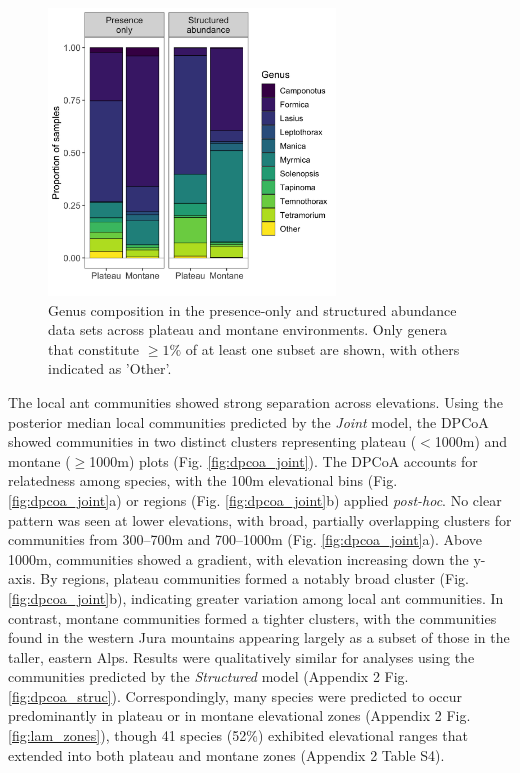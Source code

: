 \documentclass[preprint,review,times,12pt,3p]{elsarticle}
\begin{document}
\begin{figure}
	\centering\includegraphics[width=3in]{../../../ms/1_Ecography/1/figs/genus_assemblages.png}
	\caption{\label{fig:genus_assemblages} Genus composition in the presence-only and structured abundance data sets across plateau and montane environments. Only genera that constitute $\geq 1\%$ of at least one subset are shown, with others indicated as 'Other'.}
\end{figure}

The local ant communities showed strong separation across elevations. Using the posterior median local communities predicted by the \emph{Joint} model, the DPCoA showed communities in two distinct clusters representing plateau ($<$1000m) and montane ($\geq$1000m) plots (Fig. \ref{fig:dpcoa_joint}). The DPCoA accounts for relatedness among species, with the 100m elevational bins (Fig. \ref{fig:dpcoa_joint}a) or regions (Fig. \ref{fig:dpcoa_joint}b) applied \emph{post-hoc}. No clear pattern was seen at lower elevations, with broad, partially overlapping clusters for communities from 300–700m and 700–1000m (Fig. \ref{fig:dpcoa_joint}a). Above 1000m, communities showed a gradient, with elevation increasing down the y-axis. By regions, plateau communities formed a notably broad cluster (Fig. \ref{fig:dpcoa_joint}b), indicating greater variation among local ant communities. In contrast, montane communities formed a tighter clusters, with the communities found in the western Jura mountains appearing largely as a subset of those in the taller, eastern Alps. Results were qualitatively similar for analyses using the communities predicted by the \emph{Structured} model (Appendix 2 Fig. \ref{fig:dpcoa_struc}). Correspondingly, many species were predicted to occur predominantly in plateau or in montane elevational zones (Appendix 2 Fig. \ref{fig:lam_zones}), though 41 species (52\%) exhibited elevational ranges that extended into both plateau and montane zones (Appendix 2 Table S4).
\end{document}
